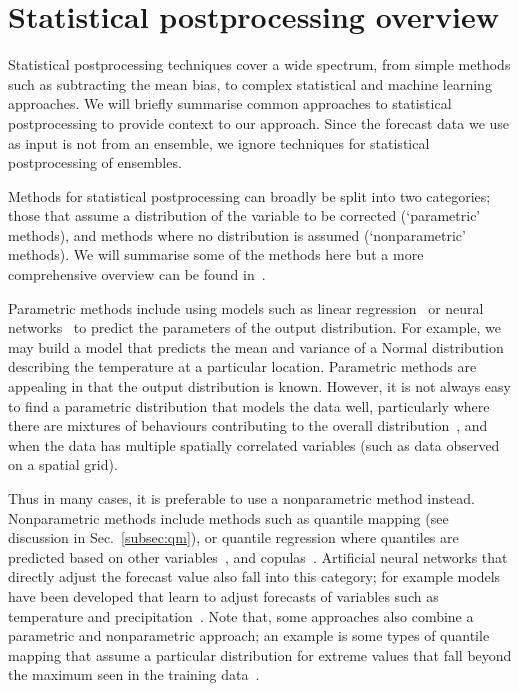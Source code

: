 \documentclass[../main.tex]{subfiles}
\begin{document}
\section{Statistical postprocessing overview}
\label{sec:stat_proc}
Statistical postprocessing techniques cover a wide spectrum, from simple methods such as subtracting the mean bias, to complex statistical and machine learning approaches. We will briefly summarise common approaches to statistical postprocessing to provide context to our approach. Since the forecast data we use as input is not from an ensemble, we ignore techniques for statistical postprocessing of ensembles.

Methods for statistical postprocessing can broadly be split into two categories; those that assume a distribution of the variable to be corrected (`parametric' methods), and methods where no distribution is assumed (`nonparametric' methods). We will summarise some of the methods here but a more comprehensive overview can be found in~\cite{vannitsem_statistical_2021}.

Parametric methods include using models such as linear regression~\citep{gneiting_calibrated_2005} or neural networks~\citep{rasp_neural_2018} to predict the parameters of the output distribution. For example, we may build a model that predicts the mean and variance of a Normal distribution describing the temperature at a particular location. Parametric methods are appealing in that the output distribution is known. However, it is not always easy to find a parametric distribution that models the data well, particularly where there are mixtures of behaviours contributing to the overall distribution~\citep{cavanaugh_probability_2015}, and when the data has multiple spatially correlated variables (such as data observed on a spatial grid).

Thus in many cases, it is preferable to use a nonparametric method instead. Nonparametric methods include methods such as quantile mapping (see discussion in Sec.~\ref{subsec:qm}), or quantile regression where quantiles are predicted based on other variables~\citep{bremnes_probabilistic_2004, meinshausen_quantile_2006}, and copulas~\citep{li_development_2020}. Artificial neural networks that directly adjust the forecast value also fall into this category; for example models have been developed that learn to adjust forecasts of variables such as temperature and precipitation~\citep{gronquist_deep_2021, han_deep_2021, horat_deep_2023}. Note that, some approaches also combine a parametric and nonparametric approach; an example is some types of quantile mapping that assume a particular distribution for extreme values that fall beyond the maximum seen in the training data~\citep{wood_long-range_2002}.
\end{document}
